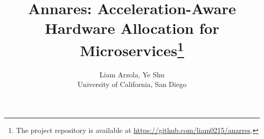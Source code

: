 \documentclass[letterpaper,twocolumn,12pt]{article}
\begin{document}
\date{}
\title{Annares: Acceleration-Aware Hardware Allocation for Microservices\thanks{The project repository is available at \url{https://github.com/liam0215/anarres}.}}


\author{
{\rm Liam Arzola, Ye Shu}\\
University of California, San Diego
}

\maketitle















\end{document}
